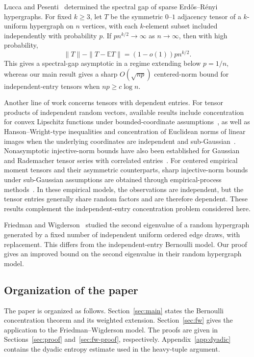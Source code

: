 \documentclass[10pt,a4paper]{amsart}
\numberwithin{equation}{section}
\newcommand{\E}{\mathbb E}
\begin{document}
Lucca and Pesenti~\cite[Theorem~1.3]{LP26} determined the
spectral gap of sparse Erd\H{o}s--R\'enyi hypergraphs.
For fixed $k\ge3$, let $T$ be the symmetric $0$--$1$ adjacency
tensor of a $k$-uniform hypergraph on $n$ vertices, with each
$k$-element subset included independently with probability $p$.
If $pn^{k/2}\to\infty$ as $n\to\infty$, then with high probability,
\[
 \|T\|-\|T-\E T\|=(1-o(1))pn^{k/2}.
\]
This gives a spectral-gap asymptotic in a regime extending below
$p=1/n$, whereas our main result gives a sharp $O(\sqrt{np})$
centered-norm bound for independent-entry tensors when $np\ge c\log n$.

Another line of work concerns tensors with dependent entries.
For tensor products of independent random vectors, available results include
concentration for convex Lipschitz functions under bounded-coordinate
assumptions~\cite{V20}, as well as Hanson--Wright-type inequalities
and concentration of Euclidean norms of linear images when the underlying
coordinates are independent and sub-Gaussian~\cite{BKW22,V20}.
Nonasymptotic injective-norm bounds have also been established for Gaussian
and Rademacher tensor series with correlated entries~\cite{BGJLR24}.
For centered empirical moment tensors and their asymmetric counterparts,
sharp injective-norm bounds under sub-Gaussian assumptions are obtained
through empirical-process methods~\cite{ACS25,CS26}.
In these empirical models, the observations are independent, but the
tensor entries generally share random factors and are therefore dependent.
These results complement the independent-entry concentration problem
considered here.

Friedman and Wigderson~\cite{FW95}
studied the second eigenvalue of a random hypergraph generated by a
fixed number of independent uniform ordered edge draws, with replacement.
This differs from the independent-entry Bernoulli model. Our proof gives an improved bound on the second eigenvalue in their random hypergraph model.


\subsection*{Organization of the paper}
The paper is organized as follows. Section~\ref{sec:main} states
the Bernoulli concentration theorem and its weighted extension.
Section~\ref{sec:fw} gives the application to the
Friedman--Wigderson model. The proofs are given in
Sections~\ref{sec:proof} and~\ref{sec:fw-proof}, respectively.
Appendix~\ref{app:dyadic} contains the dyadic entropy estimate used
in the heavy-tuple argument.
\end{document}
